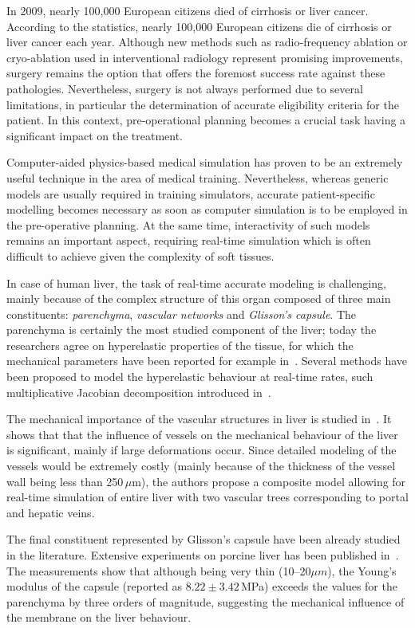 \documentclass{llncs}
\begin{document}
In 2009, nearly 100,000 European citizens died of cirrhosis or liver cancer. 
According to the statistics, nearly 100,000 European citizens die of cirrhosis or liver cancer each year. 
Although new methods such as radio-frequency ablation or cryo-ablation used in interventional radiology 
represent promising improvements, surgery remains the option that offers the foremost success rate against these pathologies. 
Nevertheless, surgery is not always performed due to several limitations, in particular the determination 
of accurate eligibility criteria for the patient. 
In this context, pre-operational planning becomes a crucial task having a significant impact on the treatment. 

Computer-aided physics-based medical simulation has proven to be an extremely useful technique in the area of medical training. 
Nevertheless, whereas generic models are usually required in training simulators, accurate patient-specific modelling
becomes necessary as soon as computer simulation is to be employed in the pre-operative planning. At the same time, 
interactivity of such models  remains an important aspect, requiring real-time simulation which is often difficult to 
achieve given the complexity of soft tissues. 

In case of human liver, the task of real-time accurate modeling is challenging, mainly because of the complex structure 
of this organ composed of three main constituents: \emph{parenchyma}, \emph{vascular networks} and \emph{Glisson's capsule}.
The parenchyma is certainly the most studied component of the liver; today the researchers agree on hyperelastic 
properties of the tissue, for which the mechanical parameters have been reported for example in~\cite{}. 
Several methods have been proposed to model the hyperelastic behaviour at real-time rates, such multiplicative Jacobian decomposition
introduced in~\cite{stephanie2008}.

The mechanical importance of the vascular structures in liver is studied in~\cite{peterlik2012}. It shows that that the 
influence of vessels on the mechanical behaviour of the liver is significant, mainly if large deformations occur. 
Since detailed modeling of the vessels would be extremely costly (mainly because of the thickness of the vessel wall 
being less than 250\,{$\mu$}m), the authors propose a composite model allowing for real-time simulation of entire liver
with two vascular trees corresponding to portal and hepatic veins.

The final constituent represented by Glisson's capsule have been already studied in the literature. 
Extensive experiments on porcine liver has been published in~\cite{Sagar}. The measurements show that although being very 
thin (10--20$\mu m$), the Young's modulus of the capsule (reported as $8.22\pm3.42$\,MPa) exceeds the values for the parenchyma by three orders of magnitude,
suggesting the mechanical influence of the membrane on the liver behaviour.
\end{document}
